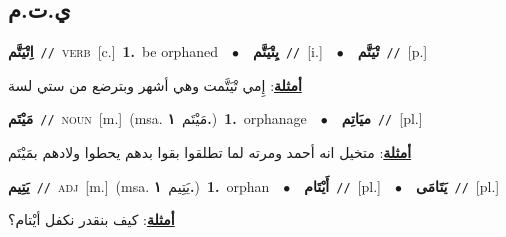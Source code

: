 \documentclass[10pt,a4paper,twoside]{article} %
\begin{document}
\begin{multicols}{2}
{\vspace{-3mm}
\subsection*{\color{blue}\foreignlanguage{arabic}{ي.ت.م}\color{blue}{}} 

{\setlength\topsep{0pt}\textbf{\foreignlanguage{arabic}{اِتْيَتَّم}}\ {\color{gray}\texttt{//}\color{black}}\ \textsc{verb}\ [c.]\ \textbf{1.}~be orphaned\ \ $\bullet$\ \ \setlength\topsep{0pt}\textbf{\foreignlanguage{arabic}{يِتْيَتَّم}}\ {\color{gray}\texttt{//}\color{black}}\ [i.]\ \ $\bullet$\ \ \setlength\topsep{0pt}\textbf{\foreignlanguage{arabic}{تْيَتَّم}}\ {\color{gray}\texttt{//}\color{black}}\ [p.]\  \begin{flushright}\color{gray}\foreignlanguage{arabic}{\textbf{\underline{\foreignlanguage{arabic}{أمثلة}}}: إِمي تْيَتَّمت وهي أشهر وبترضع من ستي لسة}\end{flushright}\color{black}} \vspace{2mm}

{\setlength\topsep{0pt}\textbf{\foreignlanguage{arabic}{مَيْتَم}}\ {\color{gray}\texttt{//}\color{black}}\ \textsc{noun}\ [m.]\ \color{gray}(msa. \foreignlanguage{arabic}{مَيْتَم}~\foreignlanguage{arabic}{\textbf{١.}})\color{black}\ \textbf{1.}~orphanage\ \ $\bullet$\ \ \setlength\topsep{0pt}\textbf{\foreignlanguage{arabic}{ميَاتِم}}\ {\color{gray}\texttt{//}\color{black}}\ [pl.]\  \begin{flushright}\color{gray}\foreignlanguage{arabic}{\textbf{\underline{\foreignlanguage{arabic}{أمثلة}}}: متخيل انه أحمد ومرته لما تطلقوا بقوا بدهم يحطوا ولادهم بمَيْتَم}\end{flushright}\color{black}} \vspace{2mm}

{\setlength\topsep{0pt}\textbf{\foreignlanguage{arabic}{يَتِيم}}\ {\color{gray}\texttt{//}\color{black}}\ \textsc{adj}\ [m.]\ \color{gray}(msa. \foreignlanguage{arabic}{يَتِيم}~\foreignlanguage{arabic}{\textbf{١.}})\color{black}\ \textbf{1.}~orphan\ \ $\bullet$\ \ \setlength\topsep{0pt}\textbf{\foreignlanguage{arabic}{أَيْتَام}}\ {\color{gray}\texttt{//}\color{black}}\ [pl.]\ \ $\bullet$\ \ \setlength\topsep{0pt}\textbf{\foreignlanguage{arabic}{يَتَامَى}}\ {\color{gray}\texttt{//}\color{black}}\ [pl.]\  \begin{flushright}\color{gray}\foreignlanguage{arabic}{\textbf{\underline{\foreignlanguage{arabic}{أمثلة}}}: كيف بنقدر نكفل أيْتام؟}\end{flushright}\color{black}} \vspace{2mm}

}
\end{multicols}
\end{document}
